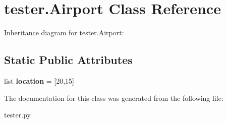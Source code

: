 \hypertarget{classtester_1_1_airport}{}\section{tester.\+Airport Class Reference}
\label{classtester_1_1_airport}


Inheritance diagram for tester.\+Airport\+:
\subsection*{Static Public Attributes}
\begin{DoxyCompactItemize}
\item 
\mbox{\label{classtester_1_1_airport_a9a6dc5a5035843d5c079602b142c13e1}} 
list {\bfseries location} = \mbox{[}20,15\mbox{]}
\end{DoxyCompactItemize}


The documentation for this class was generated from the following file\+:\begin{DoxyCompactItemize}
\item 
tester.\+py\end{DoxyCompactItemize}
